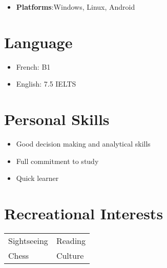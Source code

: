 \documentclass[a4paper,11pt]{article}
\newcommand{\resumeItem}[2]{
  \item{
    \textbf{#1}{:\hspace{0.5mm}#2 \vspace{-0.5mm}}
  }
}
\newcommand{\resumeSubItem}[2]{\resumeItem{#1}{#2}\vspace{-4pt}}
\newcommand{\resumeHeadingSkillStart}{\begin{itemize}[leftmargin=*,itemsep=1.7mm, rightmargin=2ex]}
\newcommand{\resumeHeadingSkillEnd}{\end{itemize}\vspace{-2mm}}
\begin{document}
\begin{itemize}
    
	\resumeSubItem
	{Platforms} %
    {Windows, Linux, Android} %
    
    
\resumeHeadingSkillEnd
\vspace{-1.5mm}

\section{\textbf{Language}}
\resumeHeadingSkillStart
	\item French: B1
	\vspace{-2mm}


	\item English: 7.5 IELTS
	\vspace{-2mm}

\resumeHeadingSkillEnd

\section{\textbf{Personal Skills}}
\resumeHeadingSkillStart
	\item Good decision making and analytical skills
	\vspace{-2mm}


	\item Full commitment to study
	\vspace{-2mm}


	\item Quick learner
	\vspace{-1mm}

\resumeHeadingSkillEnd
\vspace{-1.5mm}


\section{\textbf{Recreational Interests}}
\begin{table}[h]
	\begin{tabularx}{\textwidth} {X  X}
		Sightseeing 
		& Reading
		\\
		
		Chess
		& Culture 
		
	\end{tabularx}
\end{table}


\vspace{-1.5mm}

\vfill
\end{document}
